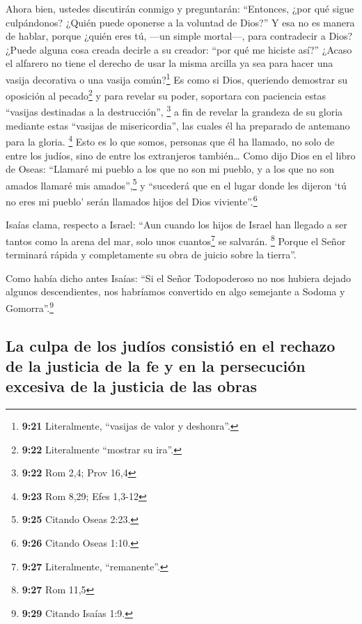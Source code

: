  Ahora bien, ustedes discutirán conmigo y preguntarán:
``Entonces, ¿por qué sigue culpándonos? ¿Quién puede oponerse a la
voluntad de Dios?''  Y esa no es manera de hablar, porque
¿quién eres tú, ---un simple mortal---, para contradecir a Dios? ¿Puede
alguna cosa creada decirle a su creador: ``por qué me hiciste así?''
 ¿Acaso el alfarero no tiene el derecho de usar la misma
arcilla ya sea para hacer una vasija decorativa o una vasija
común?\footnote{\textbf{9:21} Literalmente, ``vasijas de valor y
  deshonra''.}  Es como si Dios, queriendo demostrar su
oposición al pecado\footnote{\textbf{9:22} Literalmente ``mostrar su
  ira''.} y para revelar su poder, soportara con paciencia estas
``vasijas destinadas a la destrucción'', \footnote{\textbf{9:22} Rom
  2,4; Prov 16,4}  a fin de revelar la grandeza de su
gloria mediante estas ``vasijas de misericordia'', las cuales él ha
preparado de antemano para la gloria. \footnote{\textbf{9:23} Rom 8,29;
  Efes 1,3-12}  Esto es lo que somos, personas que él ha
llamado, no solo de entre los judíos, sino de entre los extranjeros
también\ldots{}  Como dijo Dios en el libro de Oseas:
``Llamaré mi pueblo a los que no son mi pueblo, y a los que no son
amados llamaré mis amados'',\footnote{\textbf{9:25} Citando Oseas 2:23.}
 y ``sucederá que en el lugar donde les dijeron `tú no
eres mi pueblo' serán llamados hijos del Dios viviente''.\footnote{\textbf{9:26}
  Citando Oseas 1:10.}

 Isaías clama, respecto a Israel: ``Aun cuando los hijos
de Israel han llegado a ser tantos como la arena del mar, solo unos
cuantos\footnote{\textbf{9:27} Literalmente, ``remanente''.} se
salvarán. \footnote{\textbf{9:27} Rom 11,5}  Porque el
Señor terminará rápida y completamente su obra de juicio sobre la
tierra''.

 Como había dicho antes Isaías: ``Si el Señor
Todopoderoso no nos hubiera dejado algunos descendientes, nos habríamos
convertido en algo semejante a Sodoma y Gomorra''.\footnote{\textbf{9:29}
  Citando Isaías 1:9.}

\hypertarget{la-culpa-de-los-juduxedos-consistiuxf3-en-el-rechazo-de-la-justicia-de-la-fe-y-en-la-persecuciuxf3n-excesiva-de-la-justicia-de-las-obras}{%
\subsection{La culpa de los judíos consistió en el rechazo de la
justicia de la fe y en la persecución excesiva de la justicia de las
obras}\label{la-culpa-de-los-juduxedos-consistiuxf3-en-el-rechazo-de-la-justicia-de-la-fe-y-en-la-persecuciuxf3n-excesiva-de-la-justicia-de-las-obras}}

